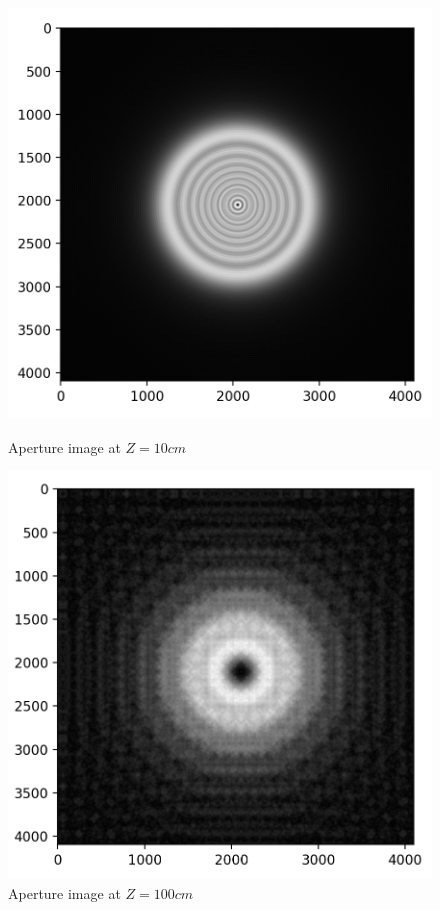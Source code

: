 \documentclass[11pt,a4paper]{article}
\begin{document}
\begin{figure}[htb]
\centering
\begin{minipage}{0.45\linewidth}
        \includegraphics[width=\textwidth]{HW2_Q6_3.1.png}
        \caption{Aperture image at $Z=10cm$}
        \label{fig:aper10cm}
\end{minipage}
\begin{minipage}{0.45\linewidth}
    \includegraphics[width=\textwidth]{HW2_Q6_3.2.png}
    \caption{Aperture image at $Z=100cm$}
    \label{fig:aper100cm}
\end{minipage}
\end{figure}
\end{document}
